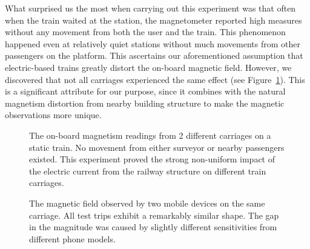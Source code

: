 \documentclass[conference]{IEEEtran}
\begin{document}
What surprised us the most when carrying out this experiment was that often when the train waited at the station, the magnetometer reported high measures without any movement from both the user and the train. This phenomenon happened even at relatively quiet stations without much movements from other passengers on the platform. This ascertains our aforementioned assumption that electric-based trains greatly distort the on-board magnetic field. However, we discovered that not all carriages experienced the same effect (see Figure~\ref{waitingatstation}). This is a significant attribute for our purpose, since it combines with the natural magnetism distortion from nearby building structure to make the magnetic observations more unique.
\begin{figure}[!t]
	\centering
	
	
	
	\caption{The on-board magnetism readings from 2 different carriages on a static train. No movement from either surveyor or nearby passengers existed. This experiment proved the strong non-uniform impact of the electric current from the railway structure on different train carriages.}
	\label{waitingatstation}
\end{figure}
\begin{figure*}[h]
	\centering
	
	\hfil
	\hfil
	\hfil
	\hfil
	\hfil	
	
	\caption{The magnetic field observed by two mobile devices on the same carriage. All test trips exhibit a remarkably similar shape. The gap in the magnitude was caused by slightly different sensitivities from different phone models.}
	\label{overgroundsamecaroverground}
\end{figure*}
\end{document}
